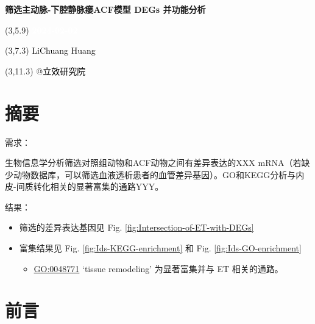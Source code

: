 \documentclass[
]{article}
\author{}
\date{\vspace{-2.5em}}
\providecommand{\tightlist}{%
  \setlength{\itemsep}{0pt}\setlength{\parskip}{0pt}}
\begin{document}
\begin{titlepage} 
\begin{center} \textbf{\Huge
筛选主动脉-下腔静脉瘘ACF模型 DEGs 并功能分析}
\vspace{4em} \begin{textblock}{10}(3,5.9) \huge
\textbf{\textcolor{white}{2024-02-02}}
\end{textblock} \begin{textblock}{10}(3,7.3)
\Large \textcolor{black}{LiChuang Huang}
\end{textblock} \begin{textblock}{10}(3,11.3)
\Large \textcolor{black}{@立效研究院}
\end{textblock} \end{center} \end{titlepage}
\restoregeometry


\tableofcontents

\listoffigures

\listoftables

\newpage


\hypertarget{abstract}{%
\section{摘要}\label{abstract}}

需求：

生物信息学分析筛选对照组动物和ACF动物之间有差异表达的XXX mRNA（若缺少动物数据库，可以筛选血液透析患者的血管差异基因）。GO和KEGG分析与内皮-间质转化相关的显著富集的通路YYY。

结果：

\begin{itemize}
\tightlist
\item
  筛选的差异表达基因见 Fig. \ref{fig:Intersection-of-ET-with-DEGs}
\item
  富集结果见 Fig. \ref{fig:Ids-KEGG-enrichment} 和 Fig. \ref{fig:Ids-GO-enrichment}

  \begin{itemize}
  \tightlist
  \item
    \url{GO:0048771} `tissue remodeling' 为显著富集并与 ET 相关的通路。
  \end{itemize}
\end{itemize}

\hypertarget{introduction}{%
\section{前言}\label{introduction}}
\end{document}

